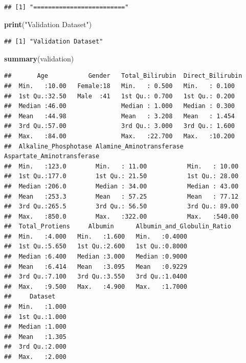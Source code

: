 \documentclass[]{article}
\newenvironment{Shaded}{\begin{snugshade}}{\end{snugshade}}
\newcommand{\KeywordTok}[1]{\textcolor[rgb]{0.13,0.29,0.53}{\textbf{#1}}}
\newcommand{\NormalTok}[1]{#1}
\newcommand{\StringTok}[1]{\textcolor[rgb]{0.31,0.60,0.02}{#1}}
\begin{document}
\begin{verbatim}
## [1] "========================="
\end{verbatim}

\begin{Shaded}
\begin{Highlighting}[]
\KeywordTok{print}\NormalTok{(}\StringTok{"Validation Dataset"}\NormalTok{)}
\end{Highlighting}
\end{Shaded}

\begin{verbatim}
## [1] "Validation Dataset"
\end{verbatim}

\begin{Shaded}
\begin{Highlighting}[]
\KeywordTok{summary}\NormalTok{(validation)}
\end{Highlighting}
\end{Shaded}

\begin{verbatim}
##       Age           Gender   Total_Bilirubin  Direct_Bilirubin
##  Min.   :10.00   Female:18   Min.   : 0.500   Min.   : 0.100  
##  1st Qu.:32.50   Male  :41   1st Qu.: 0.700   1st Qu.: 0.200  
##  Median :46.00               Median : 1.000   Median : 0.300  
##  Mean   :44.98               Mean   : 3.208   Mean   : 1.454  
##  3rd Qu.:57.00               3rd Qu.: 3.000   3rd Qu.: 1.600  
##  Max.   :84.00               Max.   :22.700   Max.   :10.200  
##  Alkaline_Phosphotase Alamine_Aminotransferase Aspartate_Aminotransferase
##  Min.   :123.0        Min.   : 11.00           Min.   : 10.00            
##  1st Qu.:177.0        1st Qu.: 21.50           1st Qu.: 28.00            
##  Median :206.0        Median : 34.00           Median : 43.00            
##  Mean   :253.3        Mean   : 57.25           Mean   : 77.12            
##  3rd Qu.:265.5        3rd Qu.: 56.50           3rd Qu.: 89.00            
##  Max.   :850.0        Max.   :322.00           Max.   :540.00            
##  Total_Protiens     Albumin      Albumin_and_Globulin_Ratio
##  Min.   :4.000   Min.   :1.600   Min.   :0.4000            
##  1st Qu.:5.650   1st Qu.:2.600   1st Qu.:0.8000            
##  Median :6.400   Median :3.000   Median :0.9000            
##  Mean   :6.414   Mean   :3.095   Mean   :0.9229            
##  3rd Qu.:7.100   3rd Qu.:3.550   3rd Qu.:1.0400            
##  Max.   :9.500   Max.   :4.900   Max.   :1.7000            
##     Dataset     
##  Min.   :1.000  
##  1st Qu.:1.000  
##  Median :1.000  
##  Mean   :1.305  
##  3rd Qu.:2.000  
##  Max.   :2.000
\end{verbatim}
\end{document}
